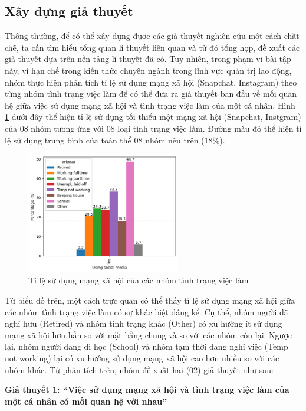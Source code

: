 \subsection{Xây dựng giả thuyết}
Thông thường, để có thể xây dựng được các giả thuyết nghiên cứu một cách chặt chẽ, ta cần tìm hiểu tổng quan lí thuyết liên quan và từ đó tổng hợp, đề xuất các giả thuyết dựa trên nền tảng lí thuyết đã có. Tuy nhiên, trong phạm vi bài tập này, vì hạn chế trong kiến thức chuyên ngành trong lĩnh vực quản trị lao động, nhóm thực hiện phân tích tỉ lệ sử dụng mạng xã hội (Snapchat, Instagram) theo từng nhóm tình trạng việc làm để có thể đưa ra giả thuyết ban đầu về mối quan hệ giữa việc sử dụng mạng xã hội và tình trạng việc làm của một cá nhân. Hình \ref{fig:using_social_media} dưới đây thể hiện tỉ lệ sử dụng tối thiểu một mạng xã hội (Snapchat, Instgram) của 08 nhóm tương ứng với 08 loại tình trạng việc làm. Đường màu đỏ thể hiện tỉ lệ sử dụng trung bình của toàn thể 08 nhóm nêu trên (18\%).

\begin{figure}[H]
    \centering
    \includegraphics[width=0.6\textwidth]{figures/using_social_media.png}
    \caption{Tỉ lệ sử dụng mạng xã hội của các nhóm tình trạng việc làm}
    \label{fig:using_social_media}
\end{figure}

Từ biểu đồ trên, một cách trực quan có thể thấy tỉ lệ sử dụng mạng xã hội giữa các nhóm tình trạng việc làm có sự khác biệt đáng kể. Cụ thể, nhóm người đã nghỉ hưu (Retired) và nhóm tình trạng khác (Other) có xu hướng ít sử dụng mạng xã hội hơn hẳn so với mặt bằng chung và so với các nhóm còn lại. Ngược lại, nhóm người đang đi học (School) và nhóm tạm thời đang nghỉ việc (Temp not working) lại có xu hướng sử dụng mạng xã hội cao hơn nhiều so với các nhóm khác. Từ phân tích trên, nhóm đề xuất hai (02) giả thuyết như sau:

\textbf{Giả thuyết 1: “Việc sử dụng mạng xã hội và tình trạng việc làm của một cá nhân có mối quan hệ với nhau”}

